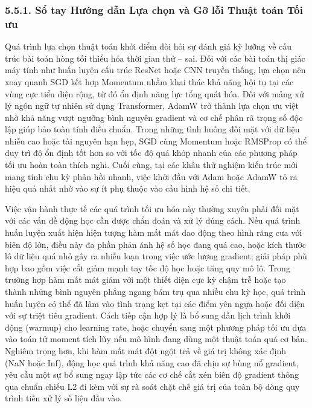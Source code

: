 \documentclass[a4paper,12pt]{article}
\begin{document}
\subsubsection{5.5.1. Sổ tay Hướng dẫn Lựa chọn và Gỡ lỗi Thuật toán Tối ưu}

Quá trình lựa chọn thuật toán khởi điểm đòi hỏi sự đánh giá kỹ lưỡng về cấu trúc bài toán hòng tối thiểu hóa thời gian thử – sai. Đối với các bài toán thị giác máy tính như huấn luyện cấu trúc ResNet hoặc CNN truyền thống, lựa chọn nên xoay quanh SGD kết hợp Momentum nhằm khai thác khả năng hội tụ tại các vùng cực tiểu diện rộng, từ đó ổn định năng lực tổng quát hóa. Đối với mảng xử lý ngôn ngữ tự nhiên sử dụng Transformer, AdamW trở thành lựa chọn ưu việt nhờ khả năng vượt ngưỡng bình nguyên gradient và cơ chế phân rã trọng số độc lập giúp bảo toàn tính điều chuẩn. Trong những tình huống đối mặt với dữ liệu nhiễu cao hoặc tài nguyên hạn hẹp, SGD cùng Momentum hoặc RMSProp có thể duy trì độ ổn định tốt hơn so với tốc độ quá khớp nhanh của các phương pháp tối ưu hoàn toàn thích nghi. Cuối cùng, tại các khâu thử nghiệm kiến trúc mới mang tính chu kỳ phản hồi nhanh, việc khởi đầu với Adam hoặc AdamW tỏ ra hiệu quả nhất nhờ vào sự ít phụ thuộc vào cấu hình hệ số chi tiết.

Việc vận hành thực tế các quá trình tối ưu hóa này thường xuyên phải đối mặt với các vấn đề động học cần được chẩn đoán và xử lý đúng cách. Nếu quá trình huấn luyện xuất hiện hiện tượng hàm mất mát dao động theo hình răng cưa với biên độ lớn, điều này đa phần phản ánh hệ số học đang quá cao, hoặc kích thước lô dữ liệu quá nhỏ gây ra nhiễu loạn trong việc ước lượng gradient; giải pháp phù hợp bao gồm việc cắt giảm mạnh tay tốc độ học hoặc tăng quy mô lô. Trong trường hợp hàm mất mát giảm với một thiết diện cực kỳ chậm trễ hoặc tạo thành những bình nguyên phẳng ngang bám trụ qua nhiều chu kỳ học, quá trình huấn luyện có thể đã lâm vào tình trạng kẹt tại các điểm yên ngựa hoặc đối diện với sự triệt tiêu gradient. Cách tiếp cận hợp lý là bổ sung dần lịch trình khởi động (warmup) cho learning rate, hoặc chuyển sang một phương pháp tối ưu dựa vào toán tử moment tích lũy nếu mô hình đang dùng một thuật toán quá cơ bản. Nghiêm trọng hơn, khi hàm mất mát đột ngột trả về giá trị không xác định (NaN hoặc Inf), động học quá trình khả năng cao đã chịu sự bùng nổ gradient, yêu cầu một sự bổ sung ngay lập tức các cơ chế cắt xén biên độ gradient thông qua chuẩn chiếu L2 đi kèm với sự rà soát chặt chẽ giá trị của toàn bộ dòng quy trình tiền xử lý số liệu đầu vào.
\end{document}
